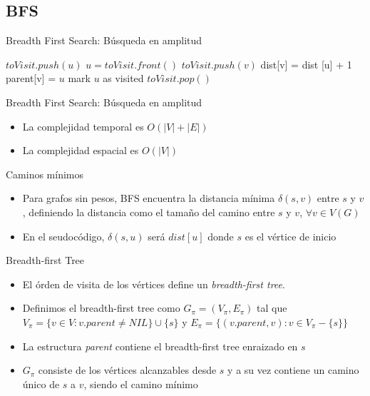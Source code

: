 \documentclass[]{beamer}
\begin{document}
\subsection{BFS}
\begin{frame}{Breadth First Search: B\'usqueda en amplitud}
  \begin{algorithm}[H]
    {$ toVisit.push(u) $} 
    {
      $u = toVisit.front() $ \;
      {
        {
          {$ toVisit.push(v)  $} \;
          { dist[v] = dist [u] + 1 } \;
          { parent[v] = $u$ } \;
          { mark $u$ as visited } \;
        }
      }
      { $toVisit.pop()$ }
    }
  \end{algorithm}
\end{frame}

\begin{frame}{Breadth First Search: B\'usqueda en amplitud}
  \begin{itemize}
    \item La complejidad temporal es $O(|V| + |E|)$
      \pause
    \item La complejidad espacial es $O(|V|)$
  \end{itemize}
\end{frame}

\begin{frame}{Caminos m\'inimos}
  \begin{itemize}
    \item Para grafos sin pesos, BFS encuentra la distancia m\'inima $\delta(s, v)$ entre $s$ y $v$, definiendo la distancia como el tama\~no del camino entre $s$ y $v$, $\forall v \in V(G)$
      \pause
    \item En el seudoc\'odigo, $\delta(s, u)$ ser\'a $dist[u]$ donde $s$ es el v\'ertice de inicio
  \end{itemize}
\end{frame}

\begin{frame}{Breadth-first Tree}
  \begin{itemize}
    \item El \'orden de visita de los v\'ertices define un \textit{breadth-first tree}. 
      \pause
    \item Definimos el breadth-first tree como $G_{\pi} = (V_{\pi}, E_{\pi})$ tal que $V_{\pi} = \{ v\in V : v.parent \neq NIL \} \cup \{s\}$ y $E_{\pi} = \{ (v.parent, v) : v\in V_{\pi} - \{s\} \}$
      \pause
    \item La estructura \textit{parent} contiene el breadth-first tree enraizado en $s$
      \pause
    \item $G_{\pi}$ consiste de los v\'ertices alcanzables desde $s$ y a su vez contiene un camino \'unico de $s$ a $v$, siendo el camino m\'inimo
  \end{itemize}
\end{frame}
\end{document}
